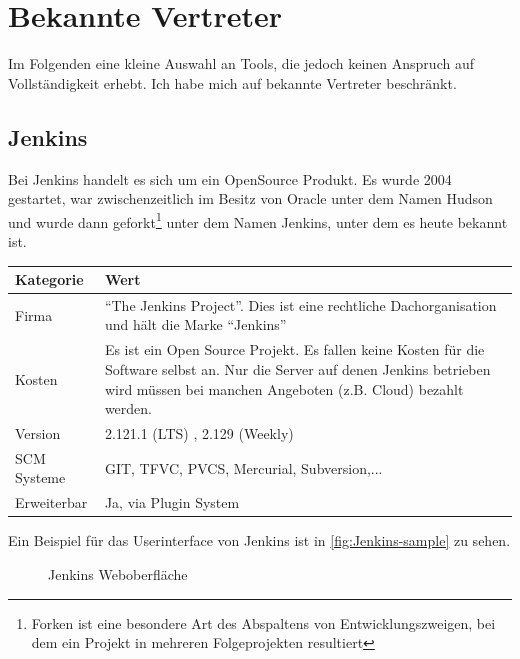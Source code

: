 \section{Bekannte Vertreter}
Im Folgenden eine kleine Auswahl an Tools, die jedoch keinen Anspruch auf Vollständigkeit erhebt. Ich habe mich auf bekannte Vertreter beschränkt.
\subsection{Jenkins}
Bei Jenkins handelt es sich um ein OpenSource Produkt. Es wurde 2004 gestartet, war zwischenzeitlich im Besitz von Oracle unter dem Namen Hudson und wurde dann geforkt\footnote{Forken ist eine besondere Art des Abspaltens von Entwicklungszweigen, bei dem ein Projekt in mehreren Folgeprojekten resultiert} unter dem Namen Jenkins, unter dem es heute bekannt ist. 
\begin{center}
  \begin{tabularx}{\textwidth}{lX}
    \toprule
    Kategorie & Wert \\
    \midrule
    Firma & "`The Jenkins Project"'. Dies ist eine rechtliche Dachorganisation und hält die Marke "`Jenkins"' \\
		\addlinespace
    Kosten & Es ist ein Open Source Projekt. Es fallen keine Kosten für die Software selbst an. Nur die Server auf denen Jenkins betrieben wird müssen bei manchen Angeboten (z.B. Cloud) bezahlt werden. \\
		\addlinespace
		Version & 2.121.1 (LTS) , 2.129 (Weekly) \\
		\addlinespace
		SCM Systeme & GIT, TFVC, PVCS, Mercurial, Subversion,...\\
		\addlinespace
		Erweiterbar & Ja, via Plugin System\\
    \bottomrule
  \end{tabularx}
\end{center}
Ein Beispiel für das Userinterface von Jenkins ist in \autoref{fig:Jenkins-sample} zu sehen. 
\begin{figure}[H]
  \centering
  \caption{Jenkins Weboberfläche \cite{Jenkins-Example}}\label{fig:Jenkins-sample}
\end{figure}
